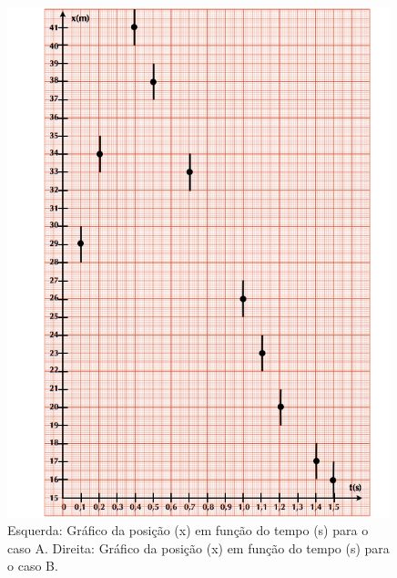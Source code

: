 \begin{figure}[t]
\begin{minipage}{\textwidth}
\begin{minipage}[t]{0.47\textwidth}
\begin{center}
 \includegraphics*[width=0.99\textwidth]{fig/Plot2}
     \end{center}
   \end{minipage}
 \end{minipage}
\caption{\label{fig:plots} Esquerda: Gráfico da posição (x) em função do tempo (s) para o caso A. Direita: Gráfico da posição (x) em função do tempo (s) para o caso B.}
\end{figure} 

